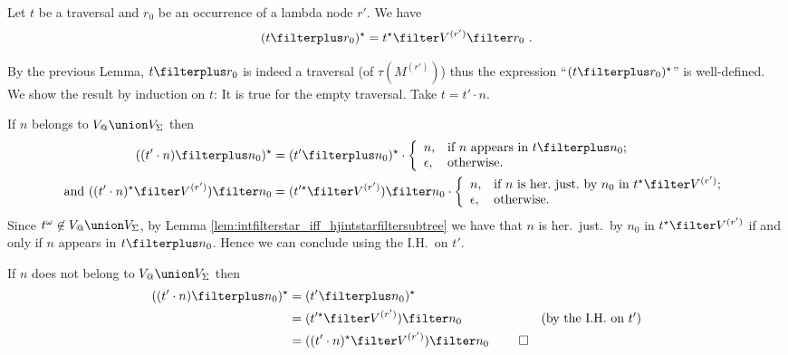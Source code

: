 \begin{lemma} \label{lem:tstarproj_eq_tprojplusstar} Let $t$ be a traversal and $r_0$ be an occurrence of a
lambda node $r'$. We have
\begin{equation*}
(t\filterplus r_0)^\star = t^\star \filter V^{(r')} \filter r_0\ .
\end{equation*}
\end{lemma}
\proof By the previous Lemma, $t\filterplus r_0$ is indeed a
traversal (of $\tau(M^{(r')})$) thus the expression ``$(t\filterplus
r_0)^\star$'' is well-defined. We show the result by induction on
$t$: It is true for the empty traversal. Take $t=t'\cdot n$.

If $n$ belongs to $V_@ \union V_\Sigma$ then
\begin{align*}
((t' \cdot n) \filterplus n_0)^\star &= (t' \filterplus n_0)^\star \cdot
                \left\{
                  \begin{array}{ll}
                    n, & \hbox{if $n$ appears in $t\filterplus n_0$;} \\
                    \epsilon, & \hbox{otherwise.}
                  \end{array}
                \right.
 \\
\mbox{and } ((t' \cdot n)^\star \filter V^{(r')}) \filter n_0 &=
(t'^\star \filter V^{(r')}) \filter n_0
\cdot
                \left\{
                  \begin{array}{ll}
                    n, & \hbox{if $n$ is her.\ just.\ by $n_0$ in $t^\star\filter V^{(r')}$;} \\
                    \epsilon, & \hbox{otherwise.}
                  \end{array}
                \right.
\end{align*}
Since $t^\omega \not\in V_@ \union V_\Sigma$, by Lemma
\ref{lem:intfilterstar_iff_hjintstarfiltersubtree} we have that $n$
is her.\ just.\ by $n_0$ in $t^\star\filter V^{(r')}$ if and only if
$n$ appears in $t\filterplus n_0$. Hence we can conclude using the
I.H.\ on $t'$.


If $n$ does not belong to $V_@ \union V_\Sigma$ then
\begin{align*}
((t' \cdot n) \filterplus n_0)^\star &= (t' \filterplus n_0)^\star \\
&= (t'^\star \filter V^{(r')}) \filter n_0 & \mbox{(by the I.H.\ on $t'$)} \\
&= ((t' \cdot n)^\star \filter V^{(r')}) \filter n_0 \ \qed
\end{align*}

